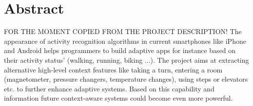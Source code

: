 \chapter{Abstract}


FOR THE MOMENT COPIED FROM THE PROJECT DESCRIPTION! The appearance of activity recognition algorithms in current smartphones like iPhone and Android helps programmers to build adaptive apps for instance based on their activity status' (walking, running, biking ...). The project aims at extracting alternative high-level context features like taking a turn, entering a room (magnetometer, pressure changers, temperature changes), using steps or elevators etc. to further enhance adaptive systems. Based on this capability and information future context-aware systems could become even more powerful.